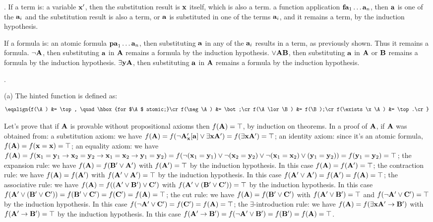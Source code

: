 . If a term is:
 a variable ${\bf x}'$, then the substitution result is ${\bf x}$ itself, which 
is also a term.
 a function application ${\bf fa}_1 \dots {\bf a}_n$, then ${\bf a}$ is one of 
the ${\bf a}_i$ and the substitution result is also a term, or ${\bf a}$ is substituted
in one of the terms ${\bf a}_i$, and it remains a term, by the induction hypothesis.

If a formula is:
 an atomic formula ${\bf pa}_1 \dots {\bf a}_n$, then substituting ${\bf a}$ in
any of the ${\bf a}_i$ results in a term, as previously shown. Thus it remains a formula.
 $\neg {\bf A}$, then substituting ${\bf a}$ in ${\bf A}$ remains a formula by the
induction hypothesis.
 $\lor{\bf A}{\bf B}$, then substituting ${\bf a}$ in ${\bf A}$ or ${\bf B}$ remains a 
formula by the induction hypothesis.
 $\exists{\bf y}{\bf A}$, then substituting ${\bf a}$ in ${\bf A}$ remains a formula 
by the induction hypothesis.
\medskip

. 

\ansitem (a)
The hinted function is defined as:
$$\eqalign{f(\A) &= \top, \quad \hbox{for $\A$ atomic;}\cr
f(\neg \A) &= \bot;\cr
f(\A \lor \B) &= f(\B);\cr
f(\exists \x\A) &= \top.\cr}$$

Let's prove that if ${\bf A}$ is provable without propositional axioms then $f({\bf A}) = \top$, by induction on theorems.
In a proof of ${\bf A}$, if ${\bf A}$ was obtained from:
\itemitem{$\bullet$} a substitution axiom: we have 
$f({\bf A}) = f(\neg {\bf A}'_{\bf x}[{\bf a}] \lor \exists {\bf x}{\bf A}') = f(\exists {\bf x}{\bf A}') = \top$;
\itemitem{$\bullet$} an identity axiom: since it's an atomic formula, $f({\bf A}) = f({\bf x} = {\bf x}) = \top$;
\itemitem{$\bullet$} an equality axiom: we have $f({\bf A}) =
f({\bf x}_1 = {\bf y}_1 \to {\bf x}_2 = {\bf y}_2 \to {\bf x}_1 = {\bf x}_2 \to {\bf y}_1 = {\bf y}_2) =
f(\neg ({\bf x}_1 = {\bf y}_1) \lor \neg ({\bf x}_2 = {\bf y}_2) \lor \neg ({\bf x}_1 = {\bf x}_2) \lor ({\bf y}_1 = {\bf y}_2)) =
f({\bf y}_1 = {\bf y}_2) = \top$;
\itemitem{$\bullet$} the expansion rule: we have $f({\bf A}) = f({\bf B}' \lor {\bf A}')$ with $f({\bf A}') = \top$ by the induction hypothesis.
In this case $f({\bf A}) = f({\bf A}') = \top$;
\itemitem{$\bullet$} the contraction rule: we have $f({\bf A}) = f({\bf A}')$ with $f({\bf A}' \lor {\bf A}') = \top$ by the induction hypothesis. 
In this case $f({\bf A}' \lor {\bf A}') = f({\bf A}') = f({\bf A}) = \top$;
\itemitem{$\bullet$} the associative rule: we have $f({\bf A}) = f(({\bf A}' \lor {\bf B}') \lor {\bf C}')$ with $f({\bf A}' \lor ({\bf B}' \lor {\bf C}')) = \top$ by the induction hypothesis.
In this case $f({\bf A}' \lor ({\bf B}' \lor {\bf C}')) = f({\bf B}' \lor {\bf C}') = f({\bf C}') = f({\bf A}) = \top$;
\itemitem{$\bullet$} the cut rule: we have $f({\bf A}) = f({\bf B}' \lor {\bf C}')$ with $f({\bf A}' \lor {\bf B}') = \top$ and $f(\neg {\bf A}' \lor {\bf C}') = \top$ by the induction hypothesis.
In this case $f(\neg {\bf A}' \lor {\bf C}') = f({\bf C}') = f({\bf A}) = \top$;
\itemitem{$\bullet$} the $\exists$-introduction rule: we have $f({\bf A}) = f(\exists {\bf x}{\bf A}' \to {\bf B}')$ with $f({\bf A}' \to {\bf B}') = \top$ by the induction hypothesis.
In this case $f({\bf A}' \to {\bf B}') = f(\neg {\bf A}' \lor {\bf B}') = f({\bf B}') = f({\bf A}) = \top$.

